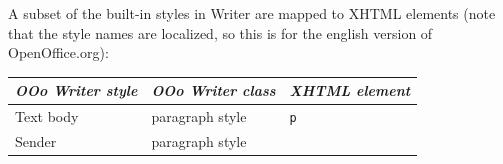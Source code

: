 \documentclass[12pt]{article}
\newcommand\textstyleSourceText[1]{\texttt{#1}}
\renewcommand\normalcolor{\color{black}}
\newenvironment{styleTextbody}{\setlength\leftskip{0cm}\setlength\rightskip{0cm}\setlength\parindent{0cm}\setlength\parfillskip{0pt plus 1fil}\setlength\parskip{0.101cm}\writerlistparindent\writerlistleftskip\leavevmode\normalfont\normalsize\normalcolor\writerlistlabel\ignorespaces}{\unskip\vspace{0.21cm}\par}
\newenvironment{styleTableHeading}{\setlength\leftskip{0cm plus 1fil}\setlength\rightskip{0cm plus 1fil}\setlength\parindent{0cm}\setlength\parfillskip{0pt}\setlength\parskip{0.101cm}\writerlistparindent\writerlistleftskip\leavevmode\normalfont\normalsize\normalcolor\bfseries\itshape\writerlistlabel\ignorespaces}{\unskip\vspace{0.21cm}\par}
\newenvironment{styleTableContents}{\setlength\leftskip{0cm}\setlength\rightskip{0cm}\setlength\parindent{0cm}\setlength\parfillskip{0pt plus 1fil}\setlength\parskip{0.101cm}\writerlistparindent\writerlistleftskip\leavevmode\normalfont\normalsize\normalcolor\writerlistlabel\ignorespaces}{\unskip\vspace{0.21cm}\par}
\newcommand\writerlistleftskip{}
\newcommand\writerlistparindent{}
\newcommand\writerlistlabel{}
\begin{document}
\begin{styleTextbody}
A subset of the built{}-in styles in Writer are mapped to XHTML elements
(note that the style names are localized, so this is for the english
version of OpenOffice.org):
\end{styleTextbody}

\begin{longtable}[l]{|p{5.466cm}|p{5.466cm}|p{5.467cm}|}
\hline
\begin{minipage}[c]{5.466cm}\begin{styleTableHeading}
OOo Writer style
\end{styleTableHeading}
\end{minipage}&
\begin{minipage}[c]{5.466cm}\begin{styleTableHeading}
OOo Writer class
\end{styleTableHeading}
\end{minipage}&
\begin{minipage}[c]{5.467cm}\begin{styleTableHeading}
XHTML element
\end{styleTableHeading}
\end{minipage}\\\hline
\endhead
\begin{minipage}[c]{5.466cm}\begin{styleTableContents}
Text body
\end{styleTableContents}
\end{minipage}&
\begin{minipage}[c]{5.466cm}\begin{styleTableContents}
paragraph style
\end{styleTableContents}
\end{minipage}&
\begin{minipage}[c]{5.467cm}\begin{styleTableContents}
\textstyleSourceText{p}
\end{styleTableContents}
\end{minipage}\\\hline
\begin{minipage}[c]{5.466cm}\begin{styleTableContents}
Sender
\end{styleTableContents}
\end{minipage}&
\begin{minipage}[c]{5.466cm}\begin{styleTableContents}
paragraph style
\end{styleTableContents}

\end{minipage}
\end{longtable}
\end{document}
